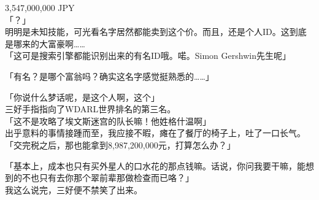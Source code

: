 3,547,000,000 JPY\\

「？」\\

明明是未知技能，可光看名字居然都能卖到这个价。而且，还是个人ID。这到底是哪来的大富豪啊……\\

「这可是搜索引擎都能识别出来的有名ID哦。喏。Simon Gershwin先生呢」

「有名？是哪个富翁吗？确实这名字感觉挺熟悉的……」

「你说什么梦话呢，是这个人啊，这个」\\

三好手指指向了WDARL世界排名的第三名。\\

「这不是攻略了埃文斯迷宫的队长嘛！他姓格什温啊」\\

出乎意料的事情接踵而至，我应接不暇，瘫在了餐厅的椅子上，吐了一口长气。\\

「交完税之后，那也能拿到8,987,200,000元，打算怎么办？」

「基本上，成本也只有买外星人的口水花的那点钱嘛。话说，你问我要干嘛，能想到的不也只有去你那个翠前辈那做检查而已咯？」\\

我这么说完，三好便不禁笑了出来。\\

